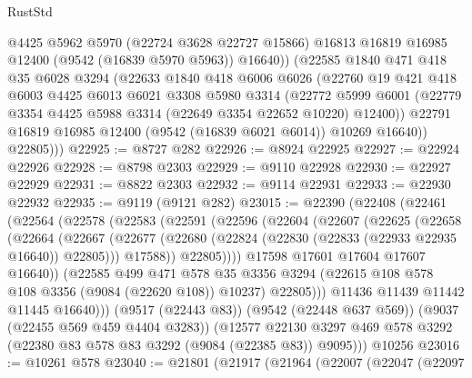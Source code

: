 \begin{lexlean}{RustStd}
\begin{coremodule}
            @4425
            @5962
            @5970
            (@22724 @3628 @22727 @15866)
            @16813
            @16819
            @16985
            @12400
            (@9542 (@16839 @5970 @5963))
            @16640))
        (@22585
          @1840
          @471
          @418
          @35
          @6028
          @3294
          (@22633
            @1840
            @418
            @6006
            @6026
            (@22760
              @19
              @421
              @418
              @6003
              @4425
              @6013
              @6021
              @3308
              @5980
              @3314
              (@22772
                @5999
                @6001
                (@22779 @3354 @4425 @5988 @3314 (@22649 @3354 @22652 @10220) @12400))
              @22791
              @16819
              @16985
              @12400
              (@9542 (@16839 @6021 @6014))
              @10269
              @16640))
          @22805)))
@22925 := @8727 @282
@22926 := @8924 @22925
@22927 := @22924 @22926
@22928 := @8798 @2303
@22929 := @9110 @22928
@22930 := @22927 @22929
@22931 := @8822 @2303
@22932 := @9114 @22931
@22933 := @22930 @22932
@22935 := @9119 (@9121 @282)
@23015 := @22390
    (@22408
      (@22461
        (@22564
          (@22578
            (@22583
              (@22591
                (@22596
                  (@22604
                    (@22607
                      (@22625
                        (@22658
                          (@22664
                            (@22667
                              (@22677
                                (@22680 (@22824 (@22830 (@22833 (@22933 @22935 @16640)) @22805)))
                                @17588))
                            @22805))))
                    @17598
                    @17601
                    @17604
                    @17607
                    @16640))
                (@22585
                  @499
                  @471
                  @578
                  @35
                  @3356
                  @3294
                  (@22615 @108 @578 @108 @3356 (@9084 (@22620 @108)) @10237)
                  @22805)))
            @11436
            @11439
            @11442
            @11445
            @16640)))
      (@9517 (@22443 @83))
      (@9542 (@22448 @637 @569))
      (@9037 (@22455 @569 @459 @4404 @3283))
      (@12577 @22130 @3297 @469 @578 @3292 (@22380 @83 @578 @83 @3292 (@9084 (@22385 @83)) @9095)))
    @10256
@23016 := @10261 @578
@23040 := @21801
    (@21917
      (@21964
        (@22007
          (@22047
            (@22097

\end{coremodule}
\end{lexlean}
